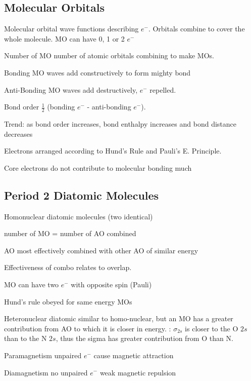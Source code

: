 \begin{mdframed}
\begin{multicols}{2}
\subsection{Molecular Orbitals}
\begin{compactdesc}
\item[Molecular orbital] wave functions describing $e^-$. Orbitals combine to
    cover the whole molecule. MO can have 0, 1 or 2 $e^-$
\item[Number of MO] number of atomic orbitals combining to make MOs.
\item[Bonding MO] waves add constructively to form mighty bond
\item[Anti-Bonding MO] waves add destructively, $e^-$ repelled.
\item[Bond order] $\frac{1}{2}$ (bonding $e^-$ - anti-bonding $e^-$).
\item[Trend:] as bond order increases, bond enthalpy increases and bond
    distance decreases
\item[Electrons arranged] according to Hund's Rule and Pauli's E. Principle.
\item[Core electrons] do not contribute to molecular bonding much
\end{compactdesc}



\subsection{Period 2 Diatomic Molecules}
\begin{compactdesc}
\item[Homonuclear diatomic] molecules (two identical)
    \begin{compactenum}
    \item number of MO = number of AO combined
    \item AO most effectively combined with other AO of similar energy
    \item Effectiveness of combo relates to overlap.
    \item MO can have two $e^-$ with opposite spin (Pauli)
    \item Hund's rule obeyed for same energy MOs
    \end{compactenum}
\item[Heteronuclear diatomic] similar to homo-nuclear, but an MO has a greater
    contribution from AO to which it is closer in energy. :
    $\sigma_{2s}$ is closer to the O $2s$ than to the N $2s$, thus
    the sigma has greater contribution from O than N.
\item[Paramagnetism] unpaired $e^-$ cause magnetic attraction
\item[Diamagnetism] no unpaired $e^-$ weak magnetic repulsion
\end{compactdesc}
\end{multicols}
\end{mdframed}

